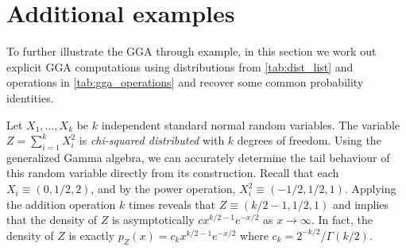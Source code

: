 \documentclass[thesis.tex]{subfiles}
\begin{document}




\section{Additional examples}\label{sec:addtl_eg}

To further illustrate the GGA through example, in this section we work
out explicit GGA computations using distributions
from \cref{tab:dist_list} and operations in \cref{tab:gga_operations}
and recover some common probability identities.

\begin{example}
	Let $X_1,\dots,X_k$ be $k$ independent standard normal random variables. The variable $Z = \sum_{i=1}^k X_i^2$ is \emph{chi-squared distributed} with $k$ degrees of freedom. Using the generalized Gamma algebra, we can accurately determine the tail behaviour of this random variable directly from its construction. Recall that each $X_i \equiv (0,1/2,2)$, and by the power operation, $X_i^2 \equiv (-1/2,1/2,1)$. Applying the addition operation $k$ times reveals that $Z \equiv (k/2-1,1/2,1)$ and implies that the density of $Z$ is asymptotically $c x^{k/2-1} e^{-x / 2}$ as $x \to \infty$. In fact, the density of $Z$ is exactly $p_Z(x) = c_k x^{k/2-1} e^{-x/2}$ where $c_k = 2^{-k/2} / \Gamma(k/2)$.
\end{example}
\end{document}
